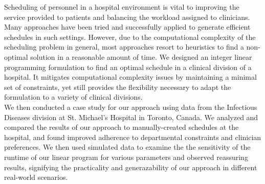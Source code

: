 Scheduling of personnel in a hospital environment is vital to improving the service provided to patients and balancing the workload assigned to clinicians. Many approaches have been tried and successfully applied to generate efficient schedules in such settings. However, due to the computational complexity of the scheduling problem in general, most approaches resort to heuristics to find a non-optimal solution in a reasonable amount of time. We designed an integer linear programming formulation to find an optimal schedule in a clinical division of a hospital. It mitigates computational complexity issues by maintaining a minimal set of constraints, yet still provides the flexibility necessary to adapt the formulation to a variety of clinical divisions. \\

We then conducted a case study for our approach using data from the Infectious Diseases division at St. Michael's Hospital in Toronto, Canada. We analyzed and compared the results of our approach to manually-created schedules at the hospital, and found improved adherence to departmental constraints and clinician preferences. We then used simulated data to examine the the sensitivity of the runtime of our linear program for various parameters and observed reassuring results, signifying the practicality and generazability of our approach in different real-world scenarios.